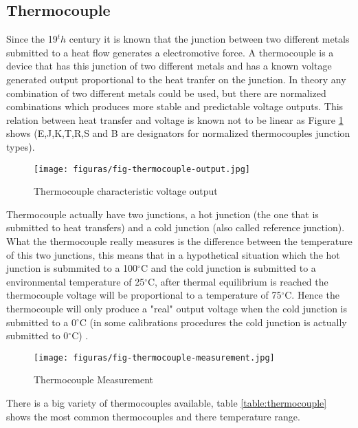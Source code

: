 \subsection{Thermocouple} \label{ssec:thermocouple}
	
	Since the 19$^th$ century it is known that the junction between two different metals submitted to a heat flow generates a electromotive force. A thermocouple is a device that has this junction of two different metals and has a known voltage generated output proportional to the heat tranfer on the junction. In theory any combination of two different metals could be used, but there are normalized combinations which produces more stable and predictable voltage outputs. \cite{pollock1991thermocouples} This relation between heat transfer and voltage is known not to be linear as Figure \ref{fig:thermocoupleVoltage} shows (E,J,K,T,R,S and B are designators for normalized thermocouples junction types).

	\begin{figure}[htbp]
		\centering
			\texttt{[image: figuras/fig-thermocouple-output.jpg]}
		\caption{Thermocouple characteristic voltage output \cite{termo-curves}}
		\label{fig:thermocoupleVoltage}
	\end{figure}
		
	Thermocouple actually have two junctions, a hot junction (the one that is submitted to heat transfers) and a cold junction (also called reference junction). What the thermocouple really measures is the difference between the temperature of this two junctions, this means that in a hypothetical situation which the hot junction is submmited to a 100$^{\circ}$C and the cold junction is submitted to a environmental temperature of 25$^{\circ}$C, after thermal equilibrium is reached the thermocouple voltage will be proportional to a temperature of 75$^{\circ}$C. Hence the thermocouple will only produce a "real" output voltage when the cold junction is submitted to a 0$^{\circ}$C (in some calibrations procedures the cold junction is actually submitted to 0$^{\circ}$C) \cite{kinzie1973thermocouple}.
		
	\begin{figure}[htbp]
		\centering
			\texttt{[image: figuras/fig-thermocouple-measurement.jpg]}
		\caption{Thermocouple Measurement \cite{termo-med}}
		\label{fig:thermocoupleMeasurement}
	\end{figure}
		
	There is a big variety of thermocouples available, table \ref{table:thermocouple} shows the most common thermocouples and there temperature range.

